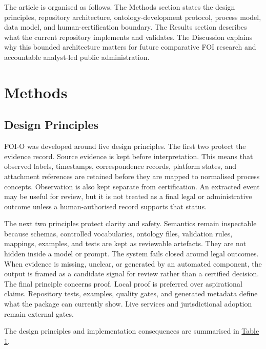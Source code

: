 \documentclass[
]{article}
\begin{document}
The article is organised as follows. The Methods section states the
design principles, repository architecture, ontology-development
protocol, process model, data model, and human-certification boundary.
The Results section describes what the current repository implements and
validates. The Discussion explains why this bounded architecture matters
for future comparative FOI research and accountable analyst-led public
administration.

\section{Methods}\label{methods}

\subsection{Design Principles}\label{design-principles}

FOI-O was developed around five design principles. The first two protect
the evidence record. Source evidence is kept before interpretation. This
means that observed labels, timestamps, correspondence records, platform
states, and attachment references are retained before they are mapped to
normalised process concepts. Observation is also kept separate from
certification. An extracted event may be useful for review, but it is
not treated as a final legal or administrative outcome unless a
human-authorised record supports that status.

The next two principles protect clarity and safety. Semantics remain
inspectable because schemas, controlled vocabularies, ontology files,
validation rules, mappings, examples, and tests are kept as reviewable
artefacts. They are not hidden inside a model or prompt. The system
fails closed around legal outcomes. When evidence is missing, unclear,
or generated by an automated component, the output is framed as a
candidate signal for review rather than a certified decision. The final
principle concerns proof. Local proof is preferred over aspirational
claims. Repository tests, examples, quality gates, and generated
metadata define what the package can currently show. Live services and
jurisdictional adoption remain external gates.

The design principles and implementation consequences are summarised in
\hyperlink{tab-design-principles}{Table 1}.
\end{document}
